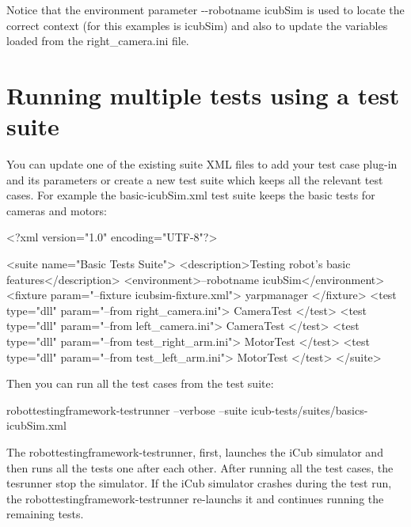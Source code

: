 Notice that the environment parameter {\ttfamily -\/-\/robotname icub\+Sim} is used to locate the correct context (for this examples is {\ttfamily icub\+Sim}) and also to update the variables loaded from the {\ttfamily right\+\_\+camera.\+ini} file.\hypertarget{writing-and-running_running_multiple_tests}{}\section{Running multiple tests using a test suite}\label{writing-and-running_running_multiple_tests}
You can update one of the existing suite X\+ML files to add your test case plug-\/in and its parameters or create a new test suite which keeps all the relevant test cases. For example the {\ttfamily basic-\/icub\+Sim.\+xml} test suite keeps the basic tests for cameras and motors\+:


\begin{DoxyCode}
<?xml version=\textcolor{stringliteral}{"1.0"} encoding=\textcolor{stringliteral}{"UTF-8"}?>

<suite name=\textcolor{stringliteral}{"Basic Tests Suite"}>
    <description>Testing robot\textcolor{stringliteral}{'s basic features</description>}
\textcolor{stringliteral}{    <environment>--robotname icubSim</environment>}
\textcolor{stringliteral}{    <fixture param="--fixture icubsim-fixture.xml"> yarpmanager </fixture>}
\textcolor{stringliteral}{}
\textcolor{stringliteral}{    }
\textcolor{stringliteral}{    <test type="dll" param="--from right\_camera.ini"> CameraTest </test>}
\textcolor{stringliteral}{    <test type="dll" param="--from left\_camera.ini"> CameraTest </test>}
\textcolor{stringliteral}{}
\textcolor{stringliteral}{    }
\textcolor{stringliteral}{    <test type="dll" param="--from test\_right\_arm.ini"> MotorTest </test>}
\textcolor{stringliteral}{    <test type="dll" param="--from test\_left\_arm.ini"> MotorTest </test>}
\textcolor{stringliteral}{</suite>}
\end{DoxyCode}


Then you can run all the test cases from the test suite\+:


\begin{DoxyCode}
robottestingframework-testrunner --verbose --suite icub-tests/suites/basics-icubSim.xml
\end{DoxyCode}


The {\ttfamily robottestingframework-\/testrunner}, first, launches the i\+Cub simulator and then runs all the tests one after each other. After running all the test cases, the {\ttfamily tesrunner} stop the simulator. If the i\+Cub simulator crashes during the test run, the {\ttfamily robottestingframework-\/testrunner} re-\/launchs it and continues running the remaining tests.

